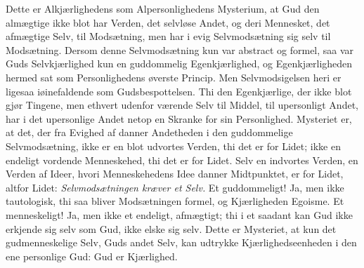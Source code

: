 \documentclass[12pt]{book}
\begin{document}
Dette er Alkjærlighedens som Alpersonlighedens Mysterium, at Gud den
almægtige ikke blot har Verden, det selvløse Andet, og deri
Mennesket, det afmægtige Selv, til Modsætning, men har i evig
Selvmodsætning sig selv til Modsætning. Dersom denne Selvmodsætning
kun var abstract og formel, saa var Guds Selvkjærlighed kun en
guddommelig Egenkjærlighed, og Egenkjærligheden hermed sat som
Personlighedens øverste Princip. Men Selvmodsigelsen heri er ligesaa
iøinefaldende som Gudsbespottelsen. Thi den Egenkjærlige, der ikke
blot gjør Tingene, men ethvert udenfor værende Selv til Middel, til
upersonligt Andet, har i det upersonlige Andet netop en Skranke for
sin Personlighed. Mysteriet er, at det, der fra Evighed af danner
Andetheden i den guddommelige Selvmodsætning, ikke er en blot
udvortes Verden, thi det er for Lidet; ikke en endeligt vordende
Menneskehed, thi det er for Lidet. Selv en indvortes Verden, en
Verden af Ideer, hvori Menneskehedens Idee danner Midtpunktet, er
for Lidet, altfor Lidet: \emph{Selvmodsætningen kræver et Selv.} Et
guddommeligt! Ja, men ikke tautologisk, thi saa bliver Modsætningen
formel, og Kjærligheden Egoisme. Et menneskeligt! Ja, men ikke et
endeligt, afmægtigt; thi i et saadant kan Gud ikke erkjende sig selv
som Gud, ikke elske sig selv. Dette er Mysteriet, at kun det
gudmenneskelige Selv, Guds andet Selv, kan udtrykke
Kjærlighedseenheden i den ene personlige Gud: Gud er Kjærlighed.
\end{document}
